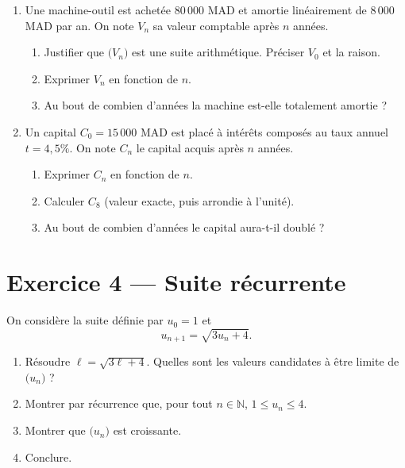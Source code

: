 \documentclass[11pt,a4paper]{article}
\begin{document}
\begin{enumerate}
  \item Une machine-outil est achetée $80\,000$ MAD et amortie linéairement de $8\,000$ MAD par an. On note $V_n$ sa valeur comptable après $n$ années.
  \begin{enumerate}
    \item Justifier que $\bigl(V_n\bigr)$ est une suite arithmétique. Préciser $V_0$ et la raison.
    \item Exprimer $V_n$ en fonction de $n$.
    \item Au bout de combien d'années la machine est-elle totalement amortie ?
  \end{enumerate}
  \item Un capital $C_0 = 15\,000$ MAD est placé à intérêts composés au taux annuel $t=4{,}5\%$. On note $C_n$ le capital acquis après $n$ années.
  \begin{enumerate}
    \item Exprimer $C_n$ en fonction de $n$.
    \item Calculer $C_8$ (valeur exacte, puis arrondie à l'unité).
    \item Au bout de combien d'années le capital aura-t-il doublé ?
  \end{enumerate}
\end{enumerate}

\section*{Exercice 4 --- Suite récurrente}

On considère la suite définie par $u_0 = 1$ et
\[
u_{n+1} = \sqrt{3u_n + 4}.
\]

\begin{enumerate}
  \item Résoudre $\ell = \sqrt{3\ell + 4}$. Quelles sont les valeurs candidates à être limite de $\bigl(u_n\bigr)$ ?
  \item Montrer par récurrence que, pour tout $n\in\mathbb{N}$, $1 \leq u_n \leq 4$.
  \item Montrer que $\bigl(u_n\bigr)$ est croissante.
  \item Conclure.
\end{enumerate}
\end{document}
